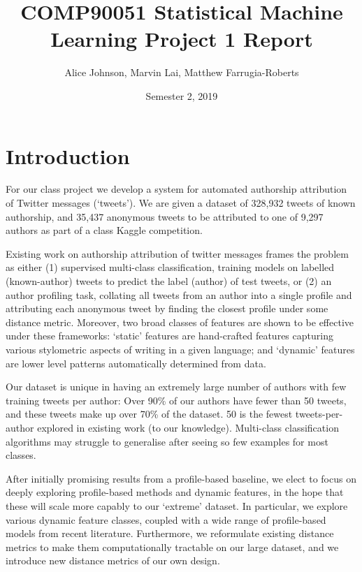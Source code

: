\documentclass[twocolumn,10pt]{article}
\title{COMP90051 Statistical Machine Learning Project 1 Report}
\author{
Alice Johnson,
Marvin Lai,
Matthew Farrugia-Roberts}
\date{Semester 2, 2019}
\begin{document}
\maketitle

\section{Introduction}
For our class project we develop a system for automated
authorship attribution of Twitter messages (`tweets'). We
are given a dataset of 328,932 tweets of known authorship,
and 35,437 anonymous tweets to be attributed to one of
9,297 authors as part of a class Kaggle competition\footnotemark.

Existing work on authorship attribution of twitter
messages\supercite{rocha2016authorship, bhargava2013stylometric, schwartz2013authorship}
frames the problem as either
(1) supervised multi-class classification, training models on
labelled (known-author) tweets to predict the label (author)
of test tweets, or
(2) an author profiling task, collating all tweets from an
author into a single profile and attributing each anonymous
tweet by finding the closest profile under some distance metric.
Moreover, two broad classes of features are shown to
be effective under these frameworks:
`static' features are hand-crafted features capturing various
stylometric aspects of writing in a given language; and
`dynamic' features are lower level patterns automatically
determined from data.

Our dataset is unique in having an extremely large number
of authors with few training tweets per author:
Over 90\% of our authors have fewer than 50 tweets,
and these tweets make up over 70\% of the dataset.
50 is the fewest tweets-per-author explored in
existing work (to our knowledge).
Multi-class classification algorithms may struggle to
generalise after seeing so few examples for most classes.

After initially promising results from a profile-based
baseline, we elect to focus on deeply exploring profile-based
methods and dynamic features, in the hope that these will
scale more capably to our `extreme' dataset.
In particular, we explore various dynamic feature classes,
coupled with a wide range of profile-based models from
recent literature.
Furthermore, we reformulate existing distance metrics
to make them computationally tractable on our large dataset,
and we introduce new distance metrics of our own design.
\end{document}
